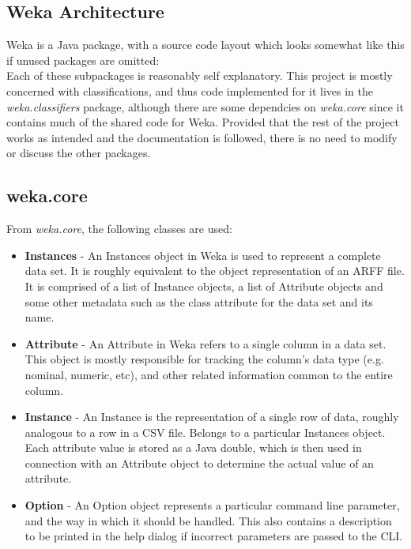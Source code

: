\subsection{Weka Architecture}
Weka is a Java package, with a source code layout which looks somewhat like this if unused packages are omitted: \\
\hfill \break
Each of these subpackages is reasonably self explanatory. This project is mostly concerned with classifications, and thus code implemented for it lives in the \textit{weka.classifiers} package, although there are some dependcies on \textit{weka.core} since it contains much of the shared code for Weka. Provided that the rest of the project works as intended and the documentation is followed, there is no need to modify or discuss the other packages.

\subsection{weka.core}
From \textit{weka.core}, the following classes are used:

\begin{itemize}
\item \textbf{Instances} - An Instances object in Weka is used to represent a complete data set. It is roughly equivalent to the object representation of an ARFF file. It is comprised of a list of Instance objects,  a list of Attribute objects and some other metadata such as the class attribute for the data set and its name.
\item \textbf{Attribute} - An Attribute in Weka refers to a single column in a data set. This object is mostly responsible for tracking the column's data type (e.g. nominal, numeric, etc), and other related information common to the entire column.
\item \textbf{Instance} - An Instance is the representation of a single row of data, roughly analogous to a row in a CSV file. Belongs to a particular Instances object. Each attribute value is stored as a Java double, which is then used in connection with an Attribute object to determine the actual value of an attribute.
\item \textbf{Option} - An Option object represents a particular command line parameter, and the way in which it should be handled. This also contains a description to be printed in the help dialog if incorrect parameters are passed to the CLI.
\end{itemize}

